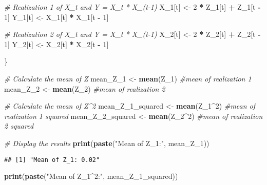 \documentclass[
]{article}
\newenvironment{Shaded}{\begin{snugshade}}{\end{snugshade}}
\newcommand{\CommentTok}[1]{\textcolor[rgb]{0.56,0.35,0.01}{\textit{#1}}}
\newcommand{\DecValTok}[1]{\textcolor[rgb]{0.00,0.00,0.81}{#1}}
\newcommand{\FunctionTok}[1]{\textcolor[rgb]{0.13,0.29,0.53}{\textbf{#1}}}
\newcommand{\NormalTok}[1]{#1}
\newcommand{\OtherTok}[1]{\textcolor[rgb]{0.56,0.35,0.01}{#1}}
\newcommand{\SpecialCharTok}[1]{\textcolor[rgb]{0.81,0.36,0.00}{\textbf{#1}}}
\newcommand{\StringTok}[1]{\textcolor[rgb]{0.31,0.60,0.02}{#1}}
\begin{document}
\begin{Shaded}
\begin{Highlighting}[]
  \CommentTok{\# Realization 1 of X\_t and Y = X\_t * X\_(t{-}1)}
\NormalTok{  X\_1[t] }\OtherTok{\textless{}{-}} \DecValTok{2} \SpecialCharTok{*}\NormalTok{ Z\_1[t] }\SpecialCharTok{+}\NormalTok{ Z\_1[t }\SpecialCharTok{{-}} \DecValTok{1}\NormalTok{]}
\NormalTok{  Y\_1[t] }\OtherTok{\textless{}{-}}\NormalTok{ X\_1[t] }\SpecialCharTok{*}\NormalTok{ X\_1[t }\SpecialCharTok{{-}} \DecValTok{1}\NormalTok{]}
  
  \CommentTok{\# Realization 2 of X\_t and Y = X\_t * X\_(t{-}1)}
\NormalTok{  X\_2[t] }\OtherTok{\textless{}{-}} \DecValTok{2} \SpecialCharTok{*}\NormalTok{ Z\_2[t] }\SpecialCharTok{+}\NormalTok{ Z\_2[t }\SpecialCharTok{{-}} \DecValTok{1}\NormalTok{]}
\NormalTok{  Y\_2[t] }\OtherTok{\textless{}{-}}\NormalTok{ X\_2[t] }\SpecialCharTok{*}\NormalTok{ X\_2[t }\SpecialCharTok{{-}} \DecValTok{1}\NormalTok{]}
  
\NormalTok{\}}
  
\CommentTok{\# Calculate the mean of Z}
\NormalTok{mean\_Z\_1 }\OtherTok{\textless{}{-}} \FunctionTok{mean}\NormalTok{(Z\_1) }\CommentTok{\#mean of realization 1}
\NormalTok{mean\_Z\_2 }\OtherTok{\textless{}{-}} \FunctionTok{mean}\NormalTok{(Z\_2) }\CommentTok{\#mean of realization 2}

\CommentTok{\# Calculate the mean of Z\^{}2}
\NormalTok{mean\_Z\_1\_squared }\OtherTok{\textless{}{-}} \FunctionTok{mean}\NormalTok{(Z\_1}\SpecialCharTok{\^{}}\DecValTok{2}\NormalTok{) }\CommentTok{\#mean of realization 1 squared}
\NormalTok{mean\_Z\_2\_squared }\OtherTok{\textless{}{-}} \FunctionTok{mean}\NormalTok{(Z\_2}\SpecialCharTok{\^{}}\DecValTok{2}\NormalTok{) }\CommentTok{\#mean of realization 2 squared}

\CommentTok{\# Display the results}
\FunctionTok{print}\NormalTok{(}\FunctionTok{paste}\NormalTok{(}\StringTok{"Mean of Z\_1:"}\NormalTok{, mean\_Z\_1))}
\end{Highlighting}
\end{Shaded}

\begin{verbatim}
## [1] "Mean of Z_1: 0.02"
\end{verbatim}

\begin{Shaded}
\begin{Highlighting}[]
\FunctionTok{print}\NormalTok{(}\FunctionTok{paste}\NormalTok{(}\StringTok{"Mean of Z\_1\^{}2:"}\NormalTok{, mean\_Z\_1\_squared))}
\end{Highlighting}
\end{Shaded}
\end{document}
